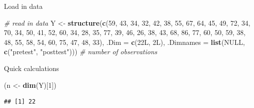 \documentclass[
  ignorenonframetext,
]{beamer}
\newenvironment{Shaded}{\begin{snugshade}}{\end{snugshade}}
\newcommand{\CommentTok}[1]{\textcolor[rgb]{0.56,0.35,0.01}{\textit{#1}}}
\newcommand{\DataTypeTok}[1]{\textcolor[rgb]{0.13,0.29,0.53}{#1}}
\newcommand{\DecValTok}[1]{\textcolor[rgb]{0.00,0.00,0.81}{#1}}
\newcommand{\KeywordTok}[1]{\textcolor[rgb]{0.13,0.29,0.53}{\textbf{#1}}}
\newcommand{\NormalTok}[1]{#1}
\newcommand{\OtherTok}[1]{\textcolor[rgb]{0.56,0.35,0.01}{#1}}
\newcommand{\StringTok}[1]{\textcolor[rgb]{0.31,0.60,0.02}{#1}}
\begin{document}
\begin{frame}[fragile]{Load in data}
\protect\hypertarget{load-in-data}{}

\begin{Shaded}
\begin{Highlighting}[]
\CommentTok{# read in data}
\NormalTok{Y <-}\StringTok{ }\KeywordTok{structure}\NormalTok{(}\KeywordTok{c}\NormalTok{(}\DecValTok{59}\NormalTok{, }\DecValTok{43}\NormalTok{, }\DecValTok{34}\NormalTok{, }\DecValTok{32}\NormalTok{, }\DecValTok{42}\NormalTok{, }\DecValTok{38}\NormalTok{, }\DecValTok{55}\NormalTok{, }\DecValTok{67}\NormalTok{, }\DecValTok{64}\NormalTok{, }
                 \DecValTok{45}\NormalTok{, }\DecValTok{49}\NormalTok{, }\DecValTok{72}\NormalTok{, }\DecValTok{34}\NormalTok{, }\DecValTok{70}\NormalTok{, }\DecValTok{34}\NormalTok{, }\DecValTok{50}\NormalTok{, }\DecValTok{41}\NormalTok{, }\DecValTok{52}\NormalTok{, }
                 \DecValTok{60}\NormalTok{, }\DecValTok{34}\NormalTok{, }\DecValTok{28}\NormalTok{, }\DecValTok{35}\NormalTok{, }\DecValTok{77}\NormalTok{, }\DecValTok{39}\NormalTok{, }\DecValTok{46}\NormalTok{, }\DecValTok{26}\NormalTok{, }\DecValTok{38}\NormalTok{, }
                 \DecValTok{43}\NormalTok{, }\DecValTok{68}\NormalTok{, }\DecValTok{86}\NormalTok{, }\DecValTok{77}\NormalTok{, }\DecValTok{60}\NormalTok{, }\DecValTok{50}\NormalTok{, }\DecValTok{59}\NormalTok{, }\DecValTok{38}\NormalTok{, }\DecValTok{48}\NormalTok{, }
                 \DecValTok{55}\NormalTok{, }\DecValTok{58}\NormalTok{, }\DecValTok{54}\NormalTok{, }\DecValTok{60}\NormalTok{, }\DecValTok{75}\NormalTok{, }\DecValTok{47}\NormalTok{, }\DecValTok{48}\NormalTok{, }\DecValTok{33}\NormalTok{), }
               \DataTypeTok{.Dim =} \KeywordTok{c}\NormalTok{(22L, 2L), }\DataTypeTok{.Dimnames =} \KeywordTok{list}\NormalTok{(}\OtherTok{NULL}\NormalTok{, }
                \KeywordTok{c}\NormalTok{(}\StringTok{"pretest"}\NormalTok{, }\StringTok{"posttest"}\NormalTok{)))}
\CommentTok{# number of observations}
\end{Highlighting}
\end{Shaded}

Quick calculations

\begin{Shaded}
\begin{Highlighting}[]
\NormalTok{(n <-}\StringTok{ }\KeywordTok{dim}\NormalTok{(Y)[}\DecValTok{1}\NormalTok{])}
\end{Highlighting}
\end{Shaded}

\begin{verbatim}
## [1] 22
\end{verbatim}


\end{frame}
\end{document}

